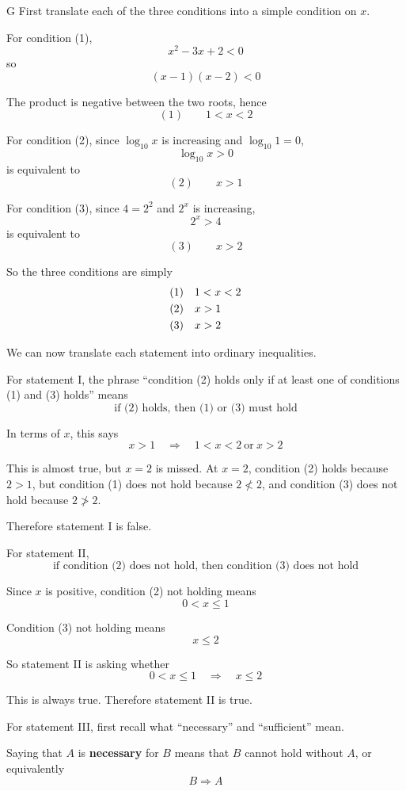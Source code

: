 \documentclass[11pt,a4paper]{article}
\begin{document}
\begin{enumerate}[label=\textbf{\arabic*.},leftmargin=*,itemsep=0pt,start=10]
\begin{djsSolution}{G}
First translate each of the three conditions into a simple condition on \(x\).

For condition (1),
\[
x^2-3x+2<0
\]
so
\[
(x-1)(x-2)<0
\]

The product is negative between the two roots, hence
\[
(1)\qquad 1<x<2
\]

For condition (2), since \(\log_{10}x\) is increasing and \(\log_{10}1=0\),
\[
\log_{10}x>0
\]
is equivalent to
\[
(2)\qquad x>1
\]

For condition (3), since \(4=2^2\) and \(2^x\) is increasing,
\[
2^x>4
\]
is equivalent to
\[
(3)\qquad x>2
\]

So the three conditions are simply
\[
\begin{array}{@{}ll@{}}
(1)&1<x<2\\[3pt]
(2)&x>1\\[3pt]
(3)&x>2
\end{array}
\]

We can now translate each statement into ordinary inequalities.

For statement I, the phrase ``condition (2) holds only if at least one of conditions (1) and (3) holds'' means
\[
\text{if (2) holds, then (1) or (3) must hold}
\]

In terms of \(x\), this says
\[
x>1
\quad\Longrightarrow\quad
1<x<2\ \text{or}\ x>2
\]

This is almost true, but \(x=2\) is missed. At \(x=2\), condition (2) holds because \(2>1\), but condition (1) does not hold because \(2\not<2\), and condition (3) does not hold because \(2\not>2\).

Therefore statement I is false.

For statement II,
\[
\text{if condition (2) does not hold, then condition (3) does not hold}
\]

Since \(x\) is positive, condition (2) not holding means
\[
0<x\leq1
\]

Condition (3) not holding means
\[
x\leq2
\]

So statement II is asking whether
\[
0<x\leq1
\quad\Longrightarrow\quad
x\leq2
\]

This is always true. Therefore statement II is true.

For statement III, first recall what ``necessary'' and ``sufficient'' mean.

Saying that \(A\) is \textbf{necessary} for \(B\) means that \(B\) cannot hold without \(A\), or equivalently
\[
B\Longrightarrow A
\]


\end{djsSolution}
\end{enumerate}
\end{document}
